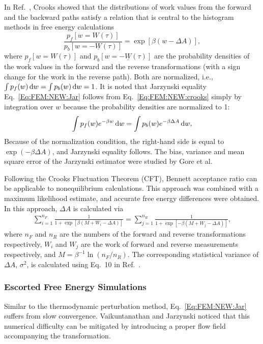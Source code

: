 In Ref.~\cite{CrooksJSP1998}, Crooks showed that the distributions of work values from the forward and the backward paths satisfy a relation that is central to the histogram methods in free energy calculations
\begin{equation}
    \frac{p_{f}[w=W(\tau)]}{p_{b}[w=-\underline{W}(\tau)]}=\exp[\beta(w-\Delta A)],
    \label{Eq:FEM:NEW:crooks}
\end{equation}
where $p_{f}[w=W(\tau)]$ and $p_{b}[w=-\underline{W}(\tau)]$ are the probability densities of the work values in the forward and the reverse transformations (with a sign change for the work in the reverse path). Both are normalized, i.e., $\int p_{f}(w) \mathop{}\!\mathrm{d} w=\int p_{b}(w) \mathop{}\!\mathrm{d} w=1$. It is noted that Jarzynski equality Eq.~\ref{Eq:FEM:NEW:Jar} follows from Eq.~\ref{Eq:FEM:NEW:crooks} simply by integration over $w$ because the probability densities are normalized to 1:
\begin{equation}
    \int p_{f}(w)e^{-\beta w}\mathop{}\!\mathrm{d} w=\int p_{b}(w)e^{-\beta \Delta A}\mathop{}\!\mathrm{d} w,
    \label{Eq:FEM:NEW:crookstojar}
\end{equation}
Because of the normalization condition, the right-hand side is equal to $\exp(-\beta \Delta A)$, and Jarzynski equality follows. The bias, variance and mean square error of the Jarzynski estimator were studied by Gore et al.\cite{GorePNAS2003}

Following the Crooks Fluctuation Theorem (CFT),\cite{CrooksJSP1998} Bennett acceptance ratio can be applicable to nonequilibrium calculations. This approach was combined with a maximum likelihood estimate, and accurate free energy differences were obtained.\cite{ShirtsPRL2003}
In this approach, $\Delta A$ is calculated via
\begin{align}
    \sum_{i=1}^{n_{F}}\frac{1}{1+\exp \left[\beta(M+W_{i}-\Delta A)\right]} = \sum_{j=1}^{n_{R}}\frac{1}{1+\exp \left[-\beta(M+W_{j}-\Delta A)\right]},
    \label{Eq:FEM:NEW:NEBAR}
\end{align}
where $n_{F}$ and $n_{R}$ are the numbers of the forward and reverse transformations respectively, $W_{i}$ and $W_{j}$ are the work of forward and reverse measurements respectively, and $M=\beta^{-1}\ln(n_{F}/n_{R})$.
The corresponding statistical variance of $ \Delta A $, $ \sigma^2 $, is calculated using Eq.~10 in Ref.~\cite{ShirtsPRL2003}.

\subsubsection{Escorted Free Energy Simulations\label{Sec:FEM:NEW:EFES}}
Similar to the thermodynamic perturbation method, Eq.~\ref{Eq:FEM:NEW:Jar} suffers from slow convergence. Vaikuntanathan and Jarzynski noticed that this numerical difficulty can be mitigated by introducing a proper flow field accompanying the transformation.\cite{VaikuntanathanPRL2008}


